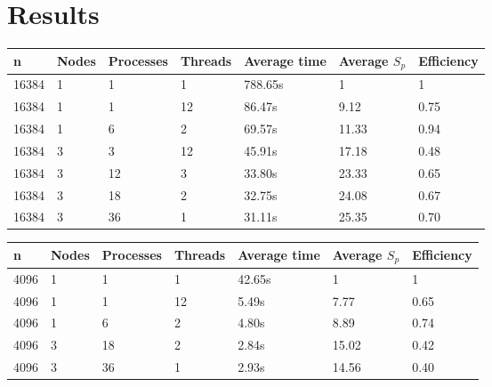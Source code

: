 \section{Results}

\begin{table}[h]
   \centering
    \begin{tabular}{| l | l | l | l | l | l | l |}
    \hline
    \bf{n} & \bf{Nodes} & \bf{Processes} &\bf{Threads} & \bf{Average time} & \bf{Average }$S_{p}$ & \bf{Efficiency} \\ \hline
    	16384 & 1 & 1 & 1 & 788.65s & 1 & 1 \\ \hline
	16384 & 1 & 1 & 12 & 86.47s & 9.12 & 0.75 \\ \hline
	16384 & 1 & 6 & 2 & 69.57s & 11.33 & 0.94 \\ \hline
	16384 & 3 & 3 & 12 & 45.91s & 17.18 & 0.48 \\ \hline
	16384 & 3 & 12 & 3 & 33.80s & 23.33 & 0.65 \\ \hline
	16384 & 3 & 18 & 2 & 32.75s & 24.08 & 0.67 \\ \hline	
	16384 & 3 & 36 & 1 & 31.11s & 25.35 & 0.70  \\ \hline
    \end{tabular}
\end{table}

\begin{table}[h]
   \centering
    \begin{tabular}{| l | l | l | l | l | l | l |}
    \hline
    \bf{n} & \bf{Nodes} & \bf{Processes} &\bf{Threads} & \bf{Average time} & \bf{Average }$S_{p}$ & \bf{Efficiency} \\ \hline
	4096 & 1 & 1 & 1 & 42.65s & 1 & 1 \\ \hline
	4096 & 1 & 1 & 12 & 5.49s & 7.77 & 0.65  \\ \hline	
	4096 & 1 & 6 & 2 & 4.80s & 8.89 & 0.74 \\ \hline
	4096 & 3 & 18 & 2 & 2.84s & 15.02 & 0.42 \\ \hline	
	4096 & 3 & 36 & 1 & 2.93s & 14.56 & 0.40 \\ \hline
    \end{tabular}
\end{table}